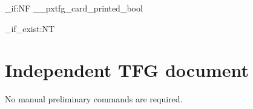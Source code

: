 \documentclass[TFG,CAT]{P3CTeX}
\begin{document}
\ExplSyntaxOn
\bool_if:NF \g__pxtfg_card_printed_bool
  {\PackageError{pxTFG.no-toc.test}{TFG card missing without TOC}{}}
\cs_if_exist:NT \pxMEMpreliminaries
  {\PackageError{pxTFG.no-toc.test}{Standalone TFG unexpectedly loaded MEM}{}}
\ExplSyntaxOff
\section{Independent TFG document}
No manual preliminary commands are required.
\end{document}
